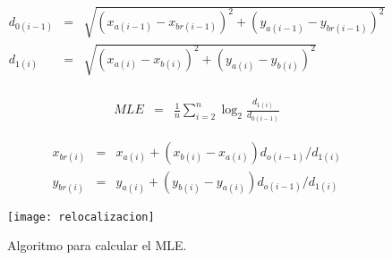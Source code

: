 \begin{eqnarray}\label{eq:D0D1}
d_{0(i-1)}&=& \sqrt{(x_{a(i-1)}-x_{br(i-1)})^2+(y_{a(i-1)}-y_{br(i-1)})^2}\nonumber\\
d_{1(i)}&=& \sqrt{(x_{a(i)}-x_{b(i)})^2+(y_{a(i)}-y_{b(i)})^2}\\
\nonumber
\end{eqnarray}

\begin{eqnarray}\label{eq:Lyapunov}
MLE &=& \frac{1}{n} \sum_{i=2}^{n} \log_2{\frac{d_{1(i)}}{d_{0(i-1)}}}
\end{eqnarray}

\begin{eqnarray}\label{eq:reubicacion}
x_{br(i)}&=& x_{a(i)}+(x_{b(i)}-x_{a(i)})d_{o(i-1)}/d_{1(i)} \nonumber\\
y_{br(i)}&=& y_{a(i)}+(y_{b(i)}-y_{a(i)})d_{o(i-1)}/d_{1(i)}
\end{eqnarray}

\begin{figure}
	\centering
	\texttt{[image: relocalizacion]}\\
	\caption{Algoritmo para calcular el MLE.}\label{fig:relocalizacion}
\end{figure}

